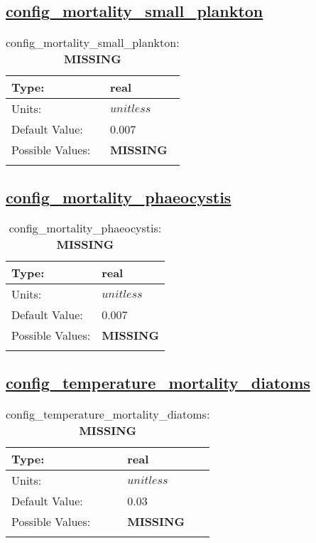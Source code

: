 \subsection[config\_mortality\_small\_plankton]{\hyperref[sec:nm_tab_biogeochemistry]{config\_mortality\_small\_plankton}}
\label{subsec:nm_sec_config_mortality_small_plankton}
\begin{center}
\begin{longtable}{| p{2.0in} || p{4.0in} |}
    \hline
    Type: & real \\
    \hline
    Units: & $unitless$ \\
    \hline
    Default Value: & 0.007 \\
    \hline
    Possible Values: & {\bf \color{red} MISSING} \\
    \hline
    \caption{config\_mortality\_small\_plankton: {\bf \color{red} MISSING}}
\end{longtable}
\end{center}
\subsection[config\_mortality\_phaeocystis]{\hyperref[sec:nm_tab_biogeochemistry]{config\_mortality\_phaeocystis}}
\label{subsec:nm_sec_config_mortality_phaeocystis}
\begin{center}
\begin{longtable}{| p{2.0in} || p{4.0in} |}
    \hline
    Type: & real \\
    \hline
    Units: & $unitless$ \\
    \hline
    Default Value: & 0.007 \\
    \hline
    Possible Values: & {\bf \color{red} MISSING} \\
    \hline
    \caption{config\_mortality\_phaeocystis: {\bf \color{red} MISSING}}
\end{longtable}
\end{center}
\subsection[config\_temperature\_mortality\_diatoms]{\hyperref[sec:nm_tab_biogeochemistry]{config\_temperature\_mortality\_diatoms}}
\label{subsec:nm_sec_config_temperature_mortality_diatoms}
\begin{center}
\begin{longtable}{| p{2.0in} || p{4.0in} |}
    \hline
    Type: & real \\
    \hline
    Units: & $unitless$ \\
    \hline
    Default Value: & 0.03 \\
    \hline
    Possible Values: & {\bf \color{red} MISSING} \\
    \hline
    \caption{config\_temperature\_mortality\_diatoms: {\bf \color{red} MISSING}}
\end{longtable}
\end{center}
